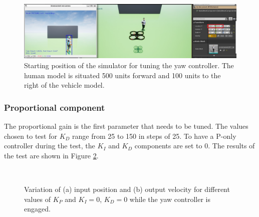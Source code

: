 \begin{figure}[H]
  \centering
  \includegraphics[width=\textwidth, keepaspectratio]{img/pid/tune-ref-pos-yaw.jpg}
  \caption{Starting position of the simulator for tuning the yaw controller. The human model is situated 500 units forward and 100 units to the right of the vehicle model.}
  \label{fig:tune-ref-pos-yaw}
\end{figure}

\subsubsection{Proportional component}

The proportional gain is the first parameter that needs to be tuned. The values chosen to test for $K_D$ range from 25 to 150 in steps of 25. To have a P-only controller during the test, the $K_I$ and $K_D$ components are set to 0. The results of the test are shown in Figure \ref{fig:tune-yaw-prop}.


\begin{figure}[H]
    \begin{minipage}[t]{0.5\linewidth}
        \centering
        \scalebox{0.55}{}
    \end{minipage}
    \begin{minipage}[t]{0.5\linewidth}
        \centering
        \scalebox{0.55}{}
    \end{minipage}
    \\
    \begin{minipage}[t]{0.5\linewidth}
        \centering
        \scalebox{0.55}{}
    \end{minipage}
    \begin{minipage}[t]{0.5\linewidth}
        \centering
        \scalebox{0.55}{}
    \end{minipage}
    \label{fig:tune-yaw-prop}
    \caption{Variation of (a) input position and (b) output velocity for different values of $K_{P}$ and $K_I=0$, $K_D=0$ while the yaw controller is engaged.}
\end{figure}


